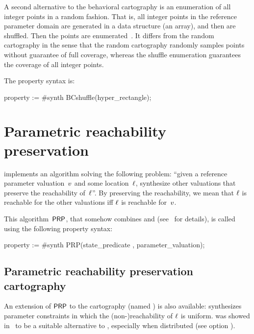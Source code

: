 A second alternative to the behavioral cartography is an enumeration of all integer points in a random fashion.
That is, all integer points in the reference parameter domain are generated in a data structure (an array), and then are shuffled.
Then the points are enumerated~\cite{ACN15}.
It differs from the random cartography in the sense that the random cartography randomly samples points without guarantee of full coverage, whereas the shuffle enumeration guarantees the coverage of all integer points.

The property syntax is:

\begin{IMITATORproperty}
property := #synth BCshuffle(hyper_rectangle);
\end{IMITATORproperty}



\section{Parametric reachability preservation}\label{section:algorithm:PRP}

\imitator{} implements an algorithm solving the following problem:
``given a reference parameter valuation~$v$ and some location~$\ell$, synthesize other valuations that preserve the reachability of~$\ell$''.
By preserving the reachability, we mean that $\ell$ is reachable for the other valuations iff $\ell$ is reachable for~$v$.

This algorithm~$\mathsf{PRP}$, that somehow combines \EFsynth{} and \IM{} (see~\cite{ALNS15} for details), is called using the following property syntax:

\begin{IMITATORproperty}
property := #synth PRP(state_predicate , parameter_valuation);
\end{IMITATORproperty}



\subsection*{Parametric reachability preservation cartography}\label{section:algorithm:PRPC}

An extension of $\mathsf{PRP}$ to the cartography (named \PRPC{}) is also available: \PRPC{} synthesizes parameter constraints in which the (non-)reachability of $\ell$ is uniform.
\PRPC{} was showed in~\cite{ALNS15} to be a suitable alternative to \EFsynth{}, especially when distributed (see option ).

